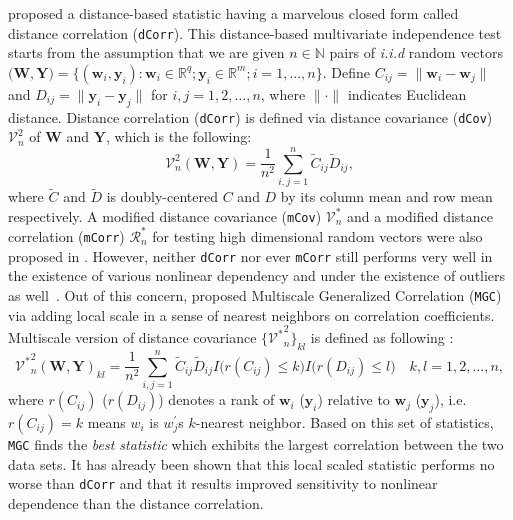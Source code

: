 \documentclass[11pt]{article}
\theoremstyle{definition}
\begin{document}
\cite{szekely2007measuring} proposed a distance-based statistic having a marvelous closed form called distance correlation (\texttt{dCorr}). This distance-based multivariate independence test starts from the assumption that we are given $n \in \mathbb{N}$ pairs of \textit{i.i.d} random vectors $\big(  \mathbf{W}, \mathbf{Y}  \big)  = \{ (\mathbf{w}_{i}, \mathbf{y}_{i}) : \mathbf{w}_{i} \in \mathbb{R}^{q}; \mathbf{y}_{i} \in \mathbb{R}^{m}; i = 1,...,n \}$. Define $C_{ij} = \parallel \mathbf{w}_{i} - \mathbf{w}_{j} \parallel$ and $D_{ij} = \parallel \mathbf{y}_{i} - \mathbf{y}_{j} \parallel$ for $i,j=1,2, \ldots ,n$, where $\parallel \cdot \parallel$ indicates Euclidean distance.
Distance correlation (\texttt{dCorr}) is defined via distance covariance (\texttt{dCov}) $\mathcal{V}^2_{n}$ of $\mathbf{W}$ and $\mathbf{Y}$, which is the following: 
\begin{equation}	 
\mathcal{V}^2_{n}(\mathbf{W}, \mathbf{Y}) = \frac{1}{n^2} \sum\limits_{i,j=1}^{n} \tilde{C}_{ij} \tilde{D}_{ij},
\end{equation}
where $\tilde{C}$ and $\tilde{D}$ is doubly-centered $C$ and $D$ by its column mean and row mean respectively. A modified distance covariance (\texttt{mCov}) $\mathcal{V}^*_{n}$ and a modified distance correlation (\texttt{mCorr}) $\mathcal{R}^{*}_{n}$ for testing high dimensional random vectors were also proposed in \cite{szekely2013distance}. However, neither \texttt{dCorr} nor ever \texttt{mCorr} still performs very well in the existence of various nonlinear dependency and under the existence of outliers as well~\citep{shen2016discovering}. Out of this concern, \cite{shen2016discovering} proposed Multiscale Generalized Correlation (\texttt{MGC}) via adding local scale in a sense of nearest neighbors on correlation coefficients. Multiscale version of distance covariance $\{ { {\mathcal{V}^{*}}^2_{n} }   \}_{kl}$ is defined as following : 
\begin{equation}
\label{eq:MGC}
{\mathcal{V}^{*}}^2_{n} (\mathbf{W}, \mathbf{Y})_{kl} = \frac{1}{n^2} \sum\limits_{i,j=1}^{n} \tilde{C}_{ij} \tilde{D}_{ij} I \big( r(C_{ij}) \leq k \big) I \big( r(D_{ij}) \leq l  \big) \quad k,l=1,2,..., n ,
\end{equation}
where $r(C_{ij})$ ($r(D_{ij})$) denotes a rank of $\mathbf{w}_{i}$ ($\mathbf{y}_{i}$) relative to $\mathbf{w}_{j}$ ($\mathbf{y}_{j}$), i.e.~$r(C_{ij}) = k$ means $w_{i}$ is $w^{'}_{j}$s $k$-nearest neighbor. Based on this set of statistics, \texttt{MGC} finds the \textit{best statistic} which exhibits the largest correlation between the two data sets. It has already been shown that this local scaled statistic performs no worse than \texttt{dCorr} and that it results improved sensitivity to nonlinear dependence than the distance correlation. 
\end{document}
